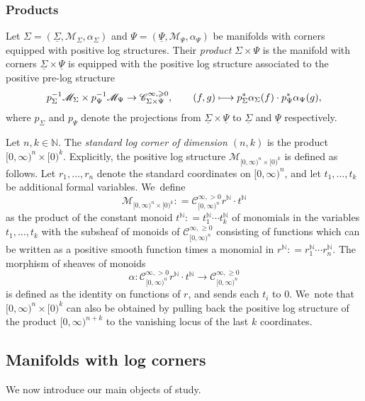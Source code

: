 \documentclass[10pt]{amsart}
\newcommand\mto{\mathchoice{\longmapsto}{\mapsto}{\mapsto}{\mapsto}}
\theoremstyle{definition}
\theoremstyle{remark}
\newenvironment{example}
  {\pushQED{\qed}\renewcommand{\qedsymbol}{$\lozenge$}\examplex}
  {\popQED\endexamplex}
\let\defn\emph
\newcommand{\NN}{\mathbb{N}}
\newcommand{\model}[2]{\halfspc{#1}\times[0)^{#2}}
\newcommand{\halfspc}[1]{[0,\infty)^{#1}}
\renewcommand{\ge}{\geqslant}
\newcommand{\defas}{\mathrel{\mathop:}=}
\newcommand{\cM}{\mathscr{M}}
\newcommand{\Cinfpos}[1]{\mathscr{C}^{\infty, > 0}_{#1}}
\newcommand{\Cinfge}[1]{\mathscr{C}^{\infty, \ge 0}_{#1}}
\newcommand{\Sig}{\Sigma}
\newcommand{\uSig}{\underline{\Sigma}}
\begin{document}
\subsubsection{Products}

Let $\Sig=(\uSig,\cM_\Sig,\alpha_\Sig)$ and $\Psi=(\underline{\Psi},\cM_\Psi,\alpha_\Psi)$ be manifolds with corners equipped with positive log structures. Their \defn{product} $\Sig\times\Psi$ is the manifold with corners $\uSig\times\underline{\Psi}$ is equipped with the positive log structure associated to the positive pre-log structure\vspace*{-3pt}
\[
p_\Sig^{-1}\cM_\Sig \times p_\Psi^{-1}\cM_{\Psi} \to \Cinfge{\Sig\times\Psi},\qquad (f,g) \mto p_\Sig^*\alpha_\Sig(f)\cdot
p_\Psi^*\alpha_\Psi(g),
\]
where $p_\Sig$ and $p_\Psi$ denote the projections from $\uSig\times\underline{\Psi}$ to $\uSig$ and $\underline{\Psi}$ respectively.

\begin{example}\label{ex:std-corner}
Let $n, k \in \NN$. The \defn{standard log corner of dimension $(n,k)$} is the product $\model{n}{k}$.
Explicitly, the positive log structure $\cM_{\model{n}{k}}$ is defined as follows.
Let $r_1,\ldots,r_n$ denote the standard coordinates on $\halfspc{n}$, and let $t_1,\ldots,t_k$ be additional formal variables. We~define
\[
\cM_{\model{n}{k}} \defas \Cinfpos{\halfspc{n}}r^\NN \cdot t^\NN
\]
as the product of the constant monoid $t^\NN\defas t_1^\NN\cdots t_k^\NN$ of monomials in the variables $t_1,\ldots,t_k$ with the subsheaf of monoids of $\Cinfge{\halfspc{n}}$ consisting of functions which can be written as a positive smooth function times a monomial in $r^\NN \defas r_1^\NN\cdots r_n^\NN$.
The morphism of sheaves of monoids
\[
\alpha\colon \Cinfpos{\halfspc{n}}r^\NN \cdot t^\NN \to \Cinfge{\halfspc{n}}
\]
is defined as the identity on functions of $r$, and sends each $t_i$ to $0$. We~note that $[0,\infty)^n\times [0)^k$ can also be obtained by pulling back the positive log structure of the product $[0,\infty)^{n+k}$ to the vanishing locus of the last $k$ coordinates.
\end{example}

\subsection{Manifolds with log corners}
We now introduce our main objects of study.
\end{document}
